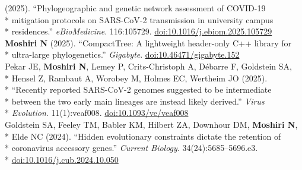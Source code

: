 \documentclass[margin,line]{res}
\begin{document}
\begin{resume}
\hspace*{9.5mm} (2025). ``Phylogeographic and genetic network assessment of COVID-19\\*
\hspace*{9.5mm} mitigation protocols on SARS-CoV-2 transmission in university campus\\*\vspace{2mm}
\hspace*{8mm} residences.'' \textit{eBioMedicine}. 116:105729. \href{https://doi.org/10.1016/j.ebiom.2025.105729}{doi:10.1016/j.ebiom.2025.105729}\\
\hspace*{4mm} \textbf{Moshiri N} (2025). ``CompactTree: A lightweight header-only C++ library for\\*\vspace{2mm}
\hspace*{8mm} ultra-large phylogenetics.'' \textit{Gigabyte}. \href{https://doi.org/10.46471/gigabyte.152}{doi:10.46471/gigabyte.152}\\
\hspace*{4mm} Pekar JE, \textbf{Moshiri N}, Lemey P, Crits-Christoph A, D\'ebarre F, Goldstein SA,\\*
\hspace*{9.5mm} Hensel Z, Rambaut A, Worobey M, Holmes EC, Wertheim JO (2025).\\*
\hspace*{9.5mm} ``Recently reported SARS-CoV-2 genomes suggested to be intermediate\\*
\hspace*{9.5mm} between the two early main lineages are instead likely derived.'' \textit{Virus}\\*\vspace{2mm}
\hspace*{8mm} \textit{Evolution}. 11(1):veaf008. \href{https://doi.org/10.1093/ve/veaf008}{doi:10.1093/ve/veaf008}\\
\hspace*{4mm} Goldstein SA, Feeley TM, Babler KM, Hilbert ZA, Downhour DM, \textbf{Moshiri N},\\*
\hspace*{9.5mm} Elde NC (2024). ``Hidden evolutionary constraints dictate the retention of\\*
\hspace*{9.5mm} coronavirus accessory genes.'' \textit{Current Biology}. 34(24):5685--5696.e3.\\*\vspace{2mm}
\hspace*{8mm} \href{https://doi.org/10.1016/j.cub.2024.10.050}{doi:10.1016/j.cub.2024.10.050}\\

\end{resume}
\end{document}
